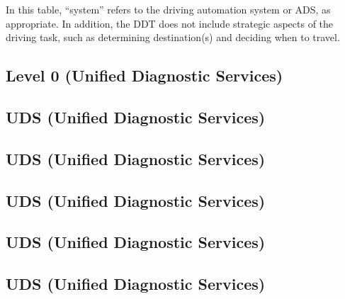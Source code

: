 In this table, “system” refers to the driving automation system or ADS, as appropriate.
In addition, the DDT does not include strategic aspects of the driving task, such as determining destination(s) and deciding when to travel.




\subsection{Level 0 (Unified Diagnostic Services)}

\subsection{UDS (Unified Diagnostic Services)}

\subsection{UDS (Unified Diagnostic Services)}
\subsection{UDS (Unified Diagnostic Services)}

\subsection{UDS (Unified Diagnostic Services)}

\subsection{UDS (Unified Diagnostic Services)}

